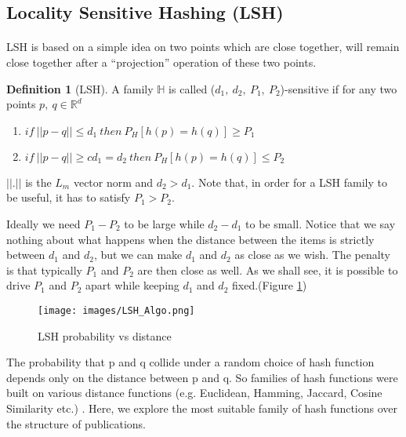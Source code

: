 \documentclass[a4paper,12pt,oneside]{book}
\theoremstyle{definition}
\newtheorem{definition}{Definition}[section]
\theoremstyle{remark}
\begin{document}
\subsection{Locality Sensitive Hashing (LSH)}
\label{sec:lsh}
\paragraph*{}
\ac{LSH} is based on a simple idea on two points which are close together, will remain close together after a “projection” operation of these two points.

\begin{definition}[\ac{LSH}]
\label{def:lsh1}
A family $\mathbb{H}$ is called ($d_1,\ d_2,\ P_1,\ P_2$)-sensitive if for any two points $p,\ q \in \mathbb{R}^d$
\begin{enumerate}[label=(\roman*)]
\item $if\ ||p-q||\leq d_1\ then\ P_H[h(p)=h(q)]\geq P_1$
\item $if\ ||p-q||\geq cd_1=d_2\ then\ P_H[h(p)=h(q)]\leq P_2$
\end{enumerate}
$||.||$ is the $L_m$ vector norm and $d_2 > d_1$. Note that, in order for a \ac{LSH} family to be useful, it has to satisfy $P_1 > P_2$. 
\end{definition}

Ideally we need $P_1 - P_2$ to be large while $d_2 - d_1$ to be small. Notice that we say nothing about what happens when the distance between the items is strictly between $d_1$ and $d_2$, but we can make $d_1$ and $d_2$ as close as we wish. The penalty is that typically $P_1$ and $P_2$ are then close as well. As we shall see, it is possible to drive $P_1$ and $P_2$ apart while keeping $d_1$ and $d_2$ fixed.(Figure \ref{img:lsh1})

\begin{figure}[H]
\begin{center}
\texttt{[image: images/LSH\_Algo.png]}
\caption{LSH probability vs distance}
\label{img:lsh1}
\end{center}
\end{figure}

The probability that p and q collide under a random choice of hash function depends only on the distance between p and q. So families of hash functions were built on various distance functions (e.g. Euclidean, Hamming, Jaccard, Cosine Similarity etc.) \cite{AnandRajaramanandJeffUllman}. Here, we explore the most suitable family of hash functions over the structure of publications.
\end{document}
